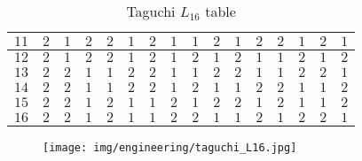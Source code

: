 \begin{itemize}
\begin{table}[H]
\begin{center}
\begin{tabular}{|c|c|c|c|c|c|c|c|c|c|c|c|c|c|c|c|}
			$11$ & $2$ & $1$ & $2$ & $2$ & $1$ & $2$ & $1$ & $1$ & $2$ & $1$ & $2$ & $2$ & $1$ & $2$ & $1$\\ \hline
			$12$ & $2$ & $1$ & $2$ & $2$ & $1$ & $2$ & $1$ & $2$ & $1$ & $2$ & $1$ & $1$ & $2$ & $1$ & $2$\\ \hline
			$13$ & $2$ & $2$ & $1$ & $1$ & $2$ & $2$ & $1$ & $1$ & $2$ & $2$ & $1$ & $1$ & $2$ & $2$ & $1$\\ \hline
			$14$ & $2$ & $2$ & $1$ & $1$ & $2$ & $2$ & $1$ & $2$ & $1$ & $1$ & $2$ & $2$ & $1$ & $1$ & $2$\\ \hline
			$15$ & $2$ & $2$ & $1$ & $2$ & $1$ & $1$ & $2$ & $1$ & $2$ & $2$ & $1$ & $2$ & $1$ & $1$ & $2$\\ \hline
			$16$ & $2$ & $2$ & $1$ & $2$ & $1$ & $1$ & $2$ & $2$ & $1$ & $1$ & $2$ & $1$ & $2$ & $2$ & $1$\\ \hline
		 	\end{tabular}
			\end{center}
			\caption{Taguchi $L_{16}$ table}
		\end{table}
		\begin{figure}[H]
			\begin{center}
			\texttt{[image: img/engineering/taguchi\_L16.jpg]}
			\end{center}	
		\end{figure}
		

\end{itemize}
